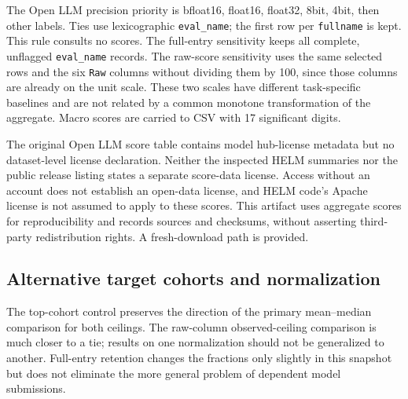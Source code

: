 \documentclass{article}
\begin{document}
The Open LLM precision priority is bfloat16, float16, float32, 8bit, 4bit, then
other labels. Ties use lexicographic \texttt{eval\_name}; the first row per
\texttt{fullname} is kept. This rule consults no scores. The full-entry sensitivity
keeps all complete, unflagged \texttt{eval\_name} records. The raw-score
sensitivity uses the same selected rows and the six \texttt{Raw} columns without
dividing them by 100, since those columns are already on the unit scale.
These two scales have different task-specific baselines and are not related by
a common monotone transformation of the aggregate. Macro scores are carried to
CSV with 17 significant digits.

\begin{table}[h]
\centering\small\setlength{\tabcolsep}{3pt}

\caption{Initial competing thresholds and winners under each audited rule.
HELM median has a tie. These entries remain in every target's rival set.}
\label{tab:leaders}
\end{table}

The original Open LLM score table contains model hub-license metadata but no
dataset-level license declaration. Neither the inspected HELM summaries nor the
public release listing states a separate score-data license. Access without an
account does not establish an open-data license, and HELM code's Apache license
is not assumed to apply to these scores. This artifact uses aggregate scores for
reproducibility and records sources and checksums, without asserting third-party
redistribution rights. A fresh-download path is provided.

\subsection{Alternative target cohorts and normalization}
\begin{table}[h]
\centering\small\setlength{\tabcolsep}{3pt}

\caption{Exact $\rho=1$ task-count controls. ``Top 20\%'' means mean rank at
most $\lceil .2n\rceil$, then common nonleader exclusion. Raw and full-entry
panels each recompute incumbents and their own common cohort.}
\label{tab:cohorts}
\end{table}
The top-cohort control preserves the direction of the primary mean--median
comparison for both ceilings. The raw-column observed-ceiling comparison is much
closer to a tie; results on one normalization should not be generalized to another.
Full-entry retention changes the fractions only slightly in this snapshot but
does not eliminate the more general problem of dependent model submissions.
\end{document}
